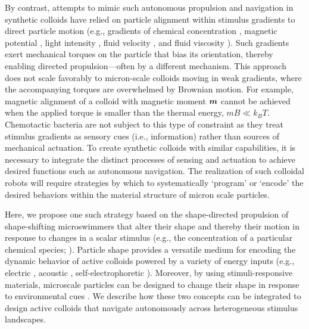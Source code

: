 By contrast, attempts to mimic such autonomous propulsion and navigation in synthetic colloids \autocite{bechinger2016active} have relied on particle alignment within stimulus gradients to direct particle motion (e.g., gradients of chemical concentration \autocite{hong2007chemotaxis,popescu2018chemotaxis}, magnetic potential \autocite{Kline2005}, light intensity \autocite{lozano2016phototaxis}, fluid velocity \autocite{Palacci2015}, and fluid viscosity \autocite{liebchen2018viscotaxis}). Such gradients exert mechanical torques on the particle that bias its orientation, thereby enabling directed propulsion---often by a different mechanism. This approach does not scale favorably to micron-scale colloids moving in weak gradients, where the accompanying torques are overwhelmed by Brownian motion. For example, magnetic alignment of a colloid with magnetic moment $\boldsymbol{m}$ cannot be achieved when the applied torque is smaller than the thermal energy, $m B\ll k_B T $. Chemotactic bacteria are not subject to this type of constraint as they treat stimulus gradients as sensory cues (i.e., information) rather than sources of mechanical actuation. To create synthetic colloids with similar capabilities, it is necessary to integrate the distinct processes of sensing and actuation to achieve desired functions such as autonomous navigation. The realization of such colloidal robots \autocite{palagi2018bioinspired, han2018engineering} will require strategies by which to systematically `program’ or `encode’ the desired behaviors within the material structure of micron scale particles.

Here, we propose one such strategy based on the shape-directed propulsion of shape-shifting microswimmers that alter their shape and thereby their motion in response to changes in a scalar stimulus (e.g., the concentration of a particular chemical species; ). Particle shape provides a versatile medium for encoding the dynamic behavior of active colloids powered by a variety of energy inputs (e.g., electric \autocite{brooks2018shape}, acoustic \autocite{sabrina2018shape}, self-electrophoretic \autocite{brooks2019shape}). Moreover, by using stimuli-responsive materials, microscale particles can be designed to change their shape in response to environmental cues \autocite{magdanz2014stimuli,palagi2016structured}.  We describe how these two concepts can be integrated to design active colloids that navigate autonomously across heterogeneous stimulus landscapes.   

